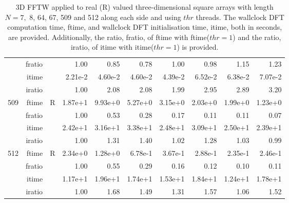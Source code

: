 \documentclass[a4paper]{article}
\begin{document}
\begin{table}[!htbp]
\begin{center}
\begin{small}
\begin{tabular}{|r|r|r|r|r|r|r|r|r|r|}
      & fratio & &     1.00 &   0.85 &   0.78 &   1.00 &   0.98 &   1.15 &   1.23        \\ 
     & itime & &       2.21e-2 &   4.60e-2 &   4.60e-2 &   4.39e-2 &   6.52e-2 &   6.38e-2 &   7.07e-2        \\ 
     & iratio & &      1.00 &   2.08 &   2.08 &   1.99 &   2.95 &   2.89 &   3.20      \\ \hline 
  509  & ftime & R  &  1.87e+1 &   9.93e+0 &   5.27e+0 &   3.15e+0 &   2.03e+0 &   1.99e+0 &   1.23e+0    \\ 
      & fratio & &     1.00 &   0.53 &   0.28 &   0.17 &   0.11 &   0.11 &   0.07        \\ 
     & itime & &       2.42e+1 &   3.16e+1 &   3.38e+1 &   2.48e+1 &   3.09e+1 &   2.50e+1 &   2.39e+1       \\ 
     & iratio & &      1.00 &   1.31 &   1.40 &   1.02 &   1.28 &   1.03 &   0.99         \\ \hline 
  512  & ftime & R  &  2.34e+0 &   1.28e+0 &   6.78e-1 &   3.67e-1 &   2.88e-1 &   2.35e-1 &   2.46e-1     \\ 
      & fratio & &     1.00 &   0.55 &   0.29 &   0.16 &   0.12 &   0.10 &   0.11     \\ 
     & itime & &       1.17e+1 &   1.96e+1 &   1.74e+1 &   1.53e+1 &   1.84e+1 &   1.24e+1 &   1.78e+1        \\ 
     & iratio & &      1.00 &   1.68 &   1.49 &   1.31 &   1.57 &   1.06 &   1.52        \\ \hline 
\end{tabular}
\caption{3D FFTW applied to real (R) valued three-dimensional square arrays with length
  $N=7,$ 8, 64, 67, 509 and 512 along each side and using $thr$ threads. The wallclock DFT computation time,
  ftime, and wallclock DFT initialisation time, itime, both in seconds, are provided. Additionally,  the ratio,
  fratio, of ftime  with ftime($thr=1$) and the ratio, iratio, of itime  with itime($thr=1$) is provided. }\label{Tbl:FFTW3d}
\end{small}
\end{center}
\end{table}
\end{document}
